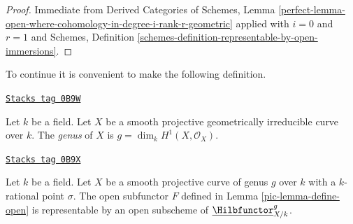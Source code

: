 \begin{proof}
Immediate from Derived Categories of Schemes, Lemma
\ref{perfect-lemma-open-where-cohomology-in-degree-i-rank-r-geometric}
applied with $i = 0$ and $r = 1$ and
Schemes, Definition \ref{schemes-definition-representable-by-open-immersions}.
\end{proof}

To continue it is convenient to make the following definition.

\begin{definition}[Genus]
\label{pic-definition-genus}
\href{https://stacks.math.columbia.edu/tag/0B9W}{\texttt{Stacks tag 0B9W}}

Let $k$ be a field. Let $X$ be a smooth projective geometrically irreducible
curve over $k$. The {\it genus} of $X$ is $g = \dim_k H^1(X, \mathcal{O}_X)$.
\end{definition}

\begin{lemma}
\label{pic-lemma-open-representable}
\href{https://stacks.math.columbia.edu/tag/0B9X}{\texttt{Stacks tag 0B9X}}

Let $k$ be a field. Let $X$ be a smooth projective curve of genus $g$
over $k$ with a $k$-rational point $\sigma$. The open subfunctor $F$ defined
in Lemma \ref{pic-lemma-define-open} is representable by an open subscheme of
$\underline{\Hilbfunctor}^g_{X/k}$.
\end{lemma}

